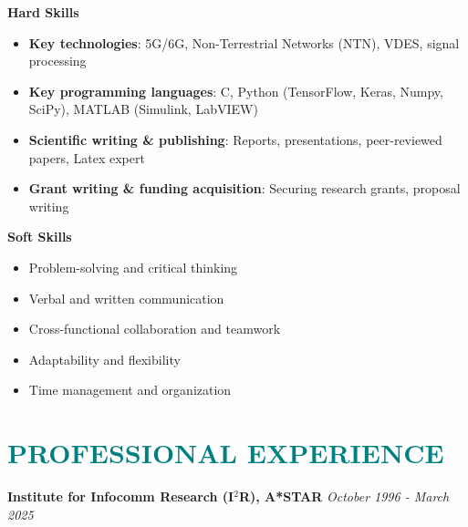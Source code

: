 \documentclass[a4paper, 11pt]{article}
\begin{document}
	\vspace{3pt}
	
	{\bf Hard Skills}
	\begin{itemize}[leftmargin=*, itemsep=-1mm]
		
		\item {\bf Key technologies}: 5G/6G, Non-Terrestrial Networks (NTN), VDES, signal processing
		
		\item {\bf Key programming languages}: C, Python (TensorFlow, Keras, Numpy, SciPy), MATLAB (Simulink, LabVIEW)
		
		\item {\bf Scientific writing \& publishing}: Reports, presentations, peer-reviewed papers, Latex expert
		
		\item {\bf Grant writing \& funding acquisition}: Securing research grants, proposal writing
		
	\end{itemize}
	
	{\bf Soft Skills}
	
	\begin{itemize}[leftmargin=*, itemsep=-1mm]
		
		\item Problem-solving and critical thinking
		
		\item Verbal and written communication
		
		\item Cross-functional collaboration and teamwork
		
		\item Adaptability and flexibility
		
		\item Time management and organization
		
	\end{itemize}
	

\section{\textcolor{teal}{\bf{PROFESSIONAL EXPERIENCE}}}

	\vspace{3pt}
		
	{\large \bf Institute for Infocomm Research (I$^{2}$R), A*STAR} \hfill {\large \it October 1996 - March 2025} 
		
	\vspace{3pt}
		
\end{document}
